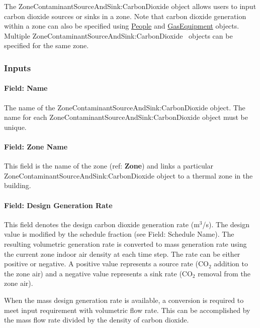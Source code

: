 The ZoneContaminantSourceAndSink:CarbonDioxide object allows users to input carbon dioxide sources or sinks in a zone. Note that carbon dioxide generation within a zone can also be specified using \hyperref[people]{People} and \hyperref[gasequipment]{GasEquipment} objects. Multiple ZoneContaminantSourceAndSink:CarbonDioxide~ objects can be specified for the same zone.

\subsubsection{Inputs}\label{inputs-10-008}

\paragraph{Field: Name}\label{field-name-10-007}

The name of the ZoneContaminantSourceAndSink:CarbonDioxide object. The name for each ZoneContaminantSourceAndSink:CarbonDioxide object must be unique.

\paragraph{Field: Zone Name}\label{field-zone-name-2-003}

This field is the name of the zone (ref: \textbf{Zone}) and links a particular ZoneContaminantSourceAndSink:CarbonDioxide object to a thermal zone in the building.

\paragraph{Field: Design Generation Rate}\label{field-design-generation-rate}

This field denotes the design carbon dioxide generation rate (m\(^{3}\)/s). The design value is modified by the schedule fraction (see Field: Schedule Name). The resulting volumetric generation rate is converted to mass generation rate using the current zone indoor air density at each time step. The rate can be either positive or negative. A positive value represents a source rate (CO\(_{2}\) addition to the zone air) and a negative value represents a sink rate (CO\(_{2}\) removal from the zone air).

When the mass design generation rate is available, a conversion is required to meet input requirement with volumetric flow rate. This can be accomplished by the mass flow rate divided by the density of carbon dioxide.

